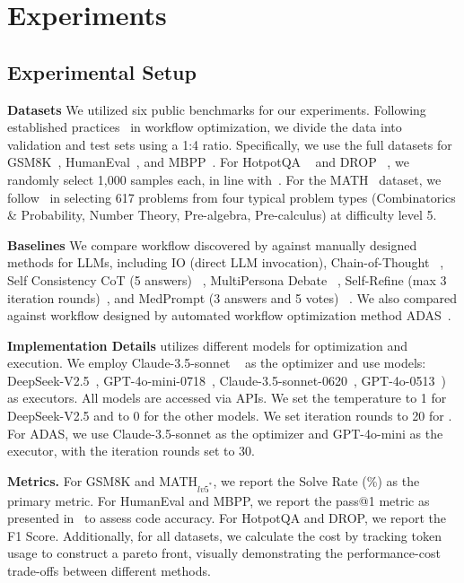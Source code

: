 \section{Experiments}

\subsection{Experimental Setup}
\textbf{Datasets} We utilized six public benchmarks for our experiments. Following established practices~\citep{saad2024archon, hu2024automated} in workflow optimization, we divide the data into validation and test sets using a 1:4 ratio. Specifically, we use the full datasets for GSM8K~\citep{cobbe2021gsm8k}, HumanEval~\citep{Chen2021Humaneval}, and MBPP~\citep{austin2021mbpp}. For HotpotQA ~\citep{zhi2018hot} and DROP ~\citep{dheer2019drop}, we randomly select 1,000 samples each, in line with~\citep{hu2024automated, Noah2023reflexion}. For the MATH~\citep{hendrycks2measuring} dataset, we follow~\citep{hong2024data} in selecting 617 problems from four typical problem types (Combinatorics \& Probability, Number Theory, Pre-algebra, Pre-calculus) at difficulty level 5.

\textbf{Baselines} We compare workflow discovered by \model against manually designed methods for LLMs, including IO (direct LLM invocation), Chain-of-Thought ~\citep{wei2022COT}, Self Consistency CoT (5 answers) ~\citep{wang2022COTSC}, MultiPersona Debate ~\citep{wang2023multipersona}, Self-Refine (max 3 iteration rounds)~\citep{madaan2023self}, and MedPrompt (3 answers and 5 votes) ~\citep{nori2023medprompt}. We also compared against workflow designed by automated workflow optimization method ADAS~\citep{hu2024automated}. 

\textbf{Implementation Details} \model utilizes different models for optimization and execution. We employ Claude-3.5-sonnet ~\citep{sonnet2024anthropic} as the optimizer and use models: DeepSeek-V2.5~\citep{deepseekv252024Deepseek}, GPT-4o-mini-0718~\citep{gpt4omini2024openai}, Claude-3.5-sonnet-0620~\citep{sonnet2024anthropic}, GPT-4o-0513~\citep{gpt4o2024openai}) as executors. All models are accessed via APIs. We set the temperature to 1 for DeepSeek-V2.5 and to 0 for the other models. We set iteration rounds to 20 for \model. For ADAS, we use Claude-3.5-sonnet as the optimizer and GPT-4o-mini as the executor, with the iteration rounds set to 30. 

\textbf{Metrics.} For GSM8K and MATH$_{lv5^*}$, we report the Solve Rate (\%) as the primary metric. For HumanEval and MBPP, we report the pass@1 metric as presented in~\citep{Chen2021Humaneval} to assess code accuracy. For HotpotQA and DROP, we report the F1 Score. Additionally, for all datasets, we calculate the cost by tracking token usage to construct a pareto front, visually demonstrating the performance-cost trade-offs between different methods.

